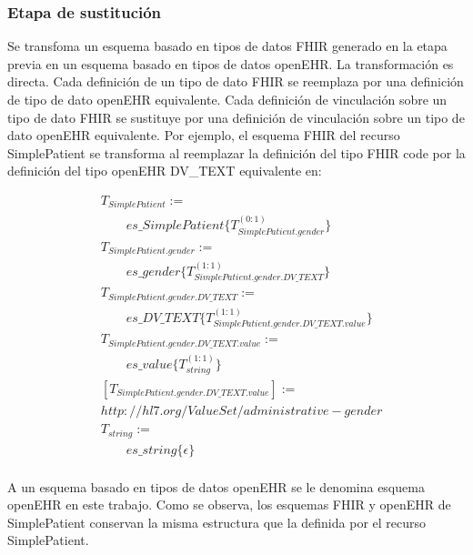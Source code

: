 \subsubsection{Etapa de sustitución}

Se transfoma un esquema basado en tipos de datos FHIR generado en la etapa previa en un esquema basado en tipos de datos openEHR. La transformación es directa. Cada definición de un tipo de dato FHIR se reemplaza por una definición de tipo de dato openEHR equivalente. Cada definición de vinculación sobre un tipo de dato FHIR se sustituye por una definición de vinculación sobre un tipo de dato openEHR equivalente. Por ejemplo, el esquema FHIR del recurso SimplePatient se transforma al reemplazar la definición del tipo FHIR code por la definición del tipo openEHR DV\_TEXT equivalente en:

\begin{align*}
&T_{SimplePatient}:= \\
&\qquad es\_SimplePatient\{T_{SimplePatient.gender}^{(0:1)}\} \\
&T_{SimplePatient.gender}:= \\
&\qquad es\_gender\{T_{SimplePatient.gender.DV\_TEXT}^{(1:1)}\} \\
&T_{SimplePatient.gender.DV\_TEXT}:= \\
&\qquad es\_DV\_TEXT\{T_{SimplePatient.gender.DV\_TEXT.value}^{(1:1)}\} \\
&T_{SimplePatient.gender.DV\_TEXT.value}:= \\
&\qquad es\_value\{T_{string}^{(1:1)}\} \\
&[T_{SimplePatient.gender.DV\_TEXT.value}] := \\
& http://hl7.org/ValueSet/administrative-gender \\
&T_{string}:= \\
&\qquad es\_string\{\epsilon\} \\
\end{align*}

A un esquema basado en tipos de datos openEHR se le denomina esquema openEHR en este trabajo. Como se observa, los esquemas FHIR y openEHR de SimplePatient conservan la misma estructura que la definida por el recurso SimplePatient.

